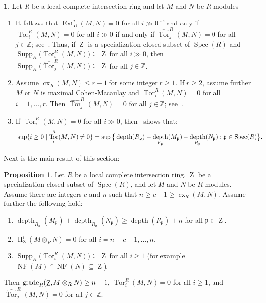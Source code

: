 \documentclass[11pt]{amsart}
\theoremstyle{definition}
\newtheorem{prop}[thm]{Proposition}
\theoremstyle{definition}
\newtheorem{chunk}[thm]{\hspace*{-1.065ex}\bf}
\numberwithin{equation}{section}
\newcommand{\fp}{\mathfrak{p}}
\newcommand{\ZZ}{\mathbb{Z}}
\DeclareMathOperator{\gr}{\textnormal{grade}}
\DeclareMathOperator{\cx}{cx}
\DeclareMathOperator{\mz}{Z}
\DeclareMathOperator{\depth}{depth}
\DeclareMathOperator{\Ext}{Ext}
\DeclareMathOperator{\hh}{H}
\DeclareMathOperator{\Supp}{Supp}
\DeclareMathOperator{\Spec}{Spec}
\DeclareMathOperator{\Tor}{Tor}
\DeclareMathOperator{\NF}{NF}
\begin{document}
\begin{chunk}\label{fp} Let $R$ be a local complete intersection ring and let $M$ and $N$ be $R$-modules.
\begin{enumerate}[\rm(i)]
\item It follows that $\Ext^i_R(M,N)=0$ for all $i\gg0$ if and only if  $\Tor_i^R(M,N)=0$ for all  $i\gg 0$  if and only if $\widehat{\Tor}_j^R(M,N)=0$ for all $j\in\ZZ$; see~\cite[4.9 and 6.1]{AvBu}. Thus, if $\mz$ is a specialization-closed subset of $\Spec(R)$ and $\Supp_R\big(\Tor_{i}^R(M,N)\big)\subseteq\mz$ for all $i\gg 0$, then $ \Supp_R\Big(\widehat{\Tor}_j^R(M,N)\Big) \subseteq\mz$ for all  $j\in\ZZ$.
\item Assume $\cx_R(M,N)\leq r-1$ for some integer $r\geq 1$. If $r\geq 2$, assume further $M$ or $N$ is maximal Cohen-Macaulay and $\Tor_i^R(M,N)=0$ for all $i=1, \ldots, r$. Then $\widehat{\Tor}_{j}^R(M,N)=0$ for all $j\in \ZZ$; see~\cite[3.5]{CST}.
\item If $\Tor_{i}^R(M,N)=0$ for all $i\gg0$, then~\cite[2.2]{J2} shows that: 
\begin{equation}\notag{}
\sup\{i\geq 0 \mid\Tor_{i}^R(M,N)\neq0\}=\sup\big\{\depth(R_\fp)-\depth_{R_{\fp}}(M_\fp)-\depth_{R_{\fp}}(N_\fp): \fp\in\Spec(R)\big \}.	
\end{equation}
\end{enumerate}
\end{chunk}

Next is the main result of this section:

\begin{prop}\label{t11} Let $R$ be a local complete intersection ring, $\mz$ be a specialization-closed subset of $\Spec(R)$, and let $M$ and $N$ be $R$-modules. Assume there are integers $c$ and $n$ such that $n\geq c-1 \geq \cx_R(M,N)$. Assume further the following hold:
\begin{enumerate}[\rm(i)]
\item $\depth_{R_\fp}(M_\fp)+\depth_{R_\fp}(N_\fp)\geq \depth(R_\fp)+n$ for all $\fp\in\mz$.
\item $\hh^i_{\mz}(M\otimes_RN)=0$ for all $i=n-c+1, \ldots, n$.
\item $\Supp_R\big(\Tor_{i}^R(M,N)\big)\subseteq\mz$ for all $i\geq 1$ (for example, $\NF(M)\cap\NF(N)\subseteq\mz$).
\end{enumerate}
Then $\gr_R(\mz,M\otimes_RN)\geq n+1$, $\Tor_i^R(M,N)=0$ for all $i\geq 1$, and $\widehat{\Tor}_j^R(M,N)=0$ for all $j\in \ZZ$.
\end{prop}
\end{document}
